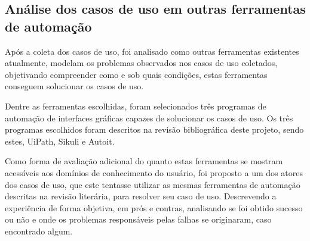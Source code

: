\documentclass[tg]{mdtufsm}
\begin{document}
        	\subsection{Análise dos casos de uso em outras ferramentas de automação}

            	Após a coleta dos casos de uso, foi analisado como outras ferramentas existentes atualmente, modelam os problemas observados nos casos de uso coletados, objetivando compreender como e sob quais condições, estas ferramentas conseguem solucionar os casos de uso.

                Dentre as ferramentas escolhidas, foram selecionados três programas de automação de interfaces gráficas capazes de solucionar os casos de uso. Os três programas escolhidos foram descritos na revisão bibliográfica deste projeto, sendo estes, UiPath, Sikuli e Autoit.

            	Como forma de avaliação adicional do quanto estas ferramentas se mostram acessíveis aos domínios de conhecimento do usuário, foi proposto a um dos atores dos casos de uso, que este tentasse utilizar as mesmas ferramentas de automação descritas na revisão literária, para resolver seu caso de uso. Descrevendo a experiência de forma objetiva, em prós e contras, analisando se foi obtido sucesso ou não e onde os problemas responsáveis pelas falhas se originaram, caso encontrado algum.
            	\bigskip
\end{document}

